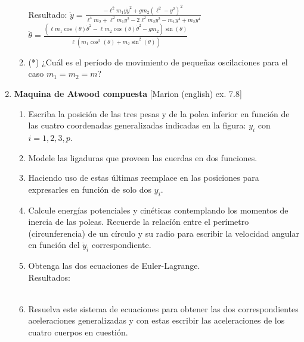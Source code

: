 \documentclass[11pt, spanish, a4paper, twoside]{article}
\begin{document}
\begin{enumerate}
\begin{enumerate}
	Resultado:
		$\ddot{y} = \frac{- \ell^{2} m_{1} y \dot{y}^{2} + g m_{2} \left(\ell^{2} - y^{2}\right)^{2}}{\ell^{4} m_{2} + \ell^{2} m_{1} y^{2} - 2 \ell^{2} m_{2} y^{2} - m_{1} y^{4} + m_{2} y^{4}}$
		\qquad
		$\ddot{\theta} = \frac{\left(\ell m_{1} \cos{\left(\theta \right)} \dot{\theta}^{2} - \ell m_{2} \cos{\left(\theta \right)} \dot{\theta}^{2} - g m_{2}\right) \sin{\left(\theta \right)}}{\ell \left(m_{1} \cos^{2}{\left(\theta \right)} + m_{2} \sin^{2}{\left(\theta \right)}\right)}$
	\item (*) ¿Cuál es el período de movimiento de pequeñas oscilaciones para el caso \(m_1 = m_2 = m\)?
\end{enumerate}



\item
\begin{minipage}[t][10cm]{0.65\textwidth}
	\textbf{Maquina de Atwood compuesta} [Marion (english) ex. 7.8]\\ 
	\begin{enumerate}
		\item Escriba la posición de las tres pesas y de la polea inferior en función de 
		las cuatro coordenadas generalizadas indicadas en la figura: \(y_i\) con \(i = 1,2,3,p\). 
		\item Modele las ligaduras que proveen las cuerdas en dos funciones.
		\item Haciendo uso de estas últimas reemplace en las posiciones para expresarles en función de solo dos \(y_i\).
		\item Calcule energías potenciales y cinéticas contemplando los momentos de inercia de las poleas.
		Recuerde la relacíón entre el perímetro (circunferencia) de un círculo y su radio para escribir la velocidad angular en función del \(\dot{y}_i\) correspondiente.
		\item Obtenga las dos ecuaciones de Euler-Lagrange.\\
		Resultados:\\
		\\
		\item Resuelva este sistema de ecuaciones para obtener las dos correspondientes aceleraciones generalizadas y con estas escribir las aceleraciones de los cuatro cuerpos en cuestión.\\

\end{enumerate}
\end{minipage}
\end{enumerate}
\end{document}

